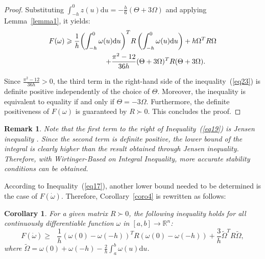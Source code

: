\documentclass[a4paper]{cas-sc}
\newtheorem*{proof}{Proof}
\newtheorem{remark}[theorem]{Remark}
\newtheorem{corollary}[theorem]{Corollary}
\begin{document}
\begin{proof}
  Substituting $ \int_{ - h}^0 z (u){\text{d}}u =  - \frac{h}{6}(\Theta  + 3\Omega ) $ and applying Lemma~\ref{lemma1}, it yields:
  \begin{equation}
    \begin{gathered}
      F(\omega ) \geqslant \frac{1}{h}{\left( {\int_{ - h}^0 {\omega (u){\text{d}}u} } \right)^T}R\left( {\int_{ - h}^0 {\omega (u){\text{d}}u} } \right) + h{\Omega ^T}R\Omega  \hfill \\
      \quad \quad \quad \quad \quad \quad \quad \quad  + \frac{{{\pi ^2} - 12}}{{36h}}{(\Theta  + 3\Omega )^T}R(\Theta  + 3\Omega ). \hfill \\
    \end{gathered}
    \label{eq23}
  \end{equation}

  Since $ \frac{{{\pi ^2} - 12}}{{36h}} > 0 $, the third term in the right-hand side of the inequality~(\ref{eq23}) is definite positive independently of the choice of $ \Theta  $. Moreover, the inequality is equivalent to equality if and only if $ \Theta  =  - 3\Omega  $. Furthermore, the definite positiveness of $ F(\omega ) $ is guaranteed by $ R \succ 0 $. This concludes the proof.

\end{proof}

\begin{remark}
  \label{remarkXX}
  Note that the first term to the right of Inequality~(\ref{eq19}) is Jensen inequality \citep{Gu2003}. Since the second term is definite positive, the lower bound of the integral is clearly higher than the result obtained through Jensen inequality. Therefore, with Wirtinger-Based on Integral Inequality, more accurate stability conditions can be obtained.
\end{remark}


According to Inequality~(\ref{eq17}), another lower bound needed to be determined is the case of $ F(\dot \omega ) $. Therefore, Corollary~\ref{coro4} is rewritten as follows:
\begin{corollary}
  \label{coro5}
  For a given matrix $ R \succ 0 $, the following inequality holds for all continuously differentiable function $ \omega  $ in $ [a,b] \to {\mathbb{R}^n} $:
  \begin{equation}
    \label{eq24}
    F(\dot \omega ) \geqslant {\text{ }}\frac{1}{h}{(\omega (0) - \omega ( - h))^T}R(\omega (0) - \omega ( - h)) + \frac{3}{h}{\tilde \Omega ^T}R\tilde \Omega,
  \end{equation}
  where $ \tilde \Omega  = \omega (0) + \omega ( - h) - \frac{2}{h}\int_a^b \omega  (u){\text{d}}u $.
\end{corollary}
\end{document}
